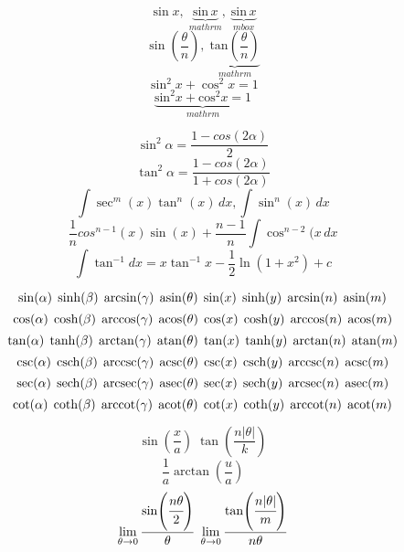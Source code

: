 \documentclass{article}
\begin{document}
\[ \sin x ,\; \underbrace{\mathrm{sin}\,x}_{mathrm},\; \underbrace{\mbox{sin}\, x}_{mbox} \]
\[ \sin\!\left(\frac{\theta}{n}\right),\; \underbrace{\mathrm{tan}\!\left(\frac{\theta}{n}\right)}_{mathrm} \]
\[ \sin^2\!x + \cos^2 \!x = 1 \]
\[ \underbrace{\mathrm{sin}^2 x + \mathrm{cos}^2 x = 1 }_{mathrm} \]

\[ \sin^2\alpha = \frac{1-cos(2\alpha)}{2} \]
\[ \tan^2\alpha = \frac{1-cos(2\alpha)}{1+cos(2\alpha)} \]
\[ \int \sec^m(x) \tan^n(x)\,dx, \int \sin^n(x)\,dx \]
\[ \frac{1}{n}cos^{n-1}(x)\sin(x) + \frac{n-1}{n}\int \cos^{n-2}(x\,dx \]
\[ \int\tan^{-1}dx=x\tan^{-1}x-\frac{1}{2}\ln\left(1+x^2\right) +c \]  

\[ \sin(\alpha)\; \sinh(\beta)\;\arcsin(\gamma)\;\asin(\theta)\;\sine(x)\;\hypsine(y)\;\arcsine(n)\;\asine(m)\]
\[ \cos(\alpha)\;\cosh(\beta)\;\arccos(\gamma)\;\acos(\theta)\;\cosine(x)\;\hypcosine(y)\;\arccosine(n)\;\acosine(m) \]
\[ \tan(\alpha)\;\tanh(\beta)\;\arctan(\gamma)\;\atan(\theta)\;\tangent(x)\;\hyptangent(y)\;\arctangent(n)\;\atangent(m) \]
\[ \csc(\alpha)\;\csch(\beta)\;\arccsc(\gamma)\;\acsc(\theta)\;\cosecant(x)\;\hypcosecant(y)\;\arccosecant(n)\;\acosecant(m) \]
\[ \sec(\alpha)\;\sech(\beta)\;\arcsec(\gamma)\;\asec(\theta)\;\secant(x)\;\hypsecant(y)\;\arcsecant(n)\;\asecant(m) \]
\[ \cot(\alpha)\;\coth(\beta)\;\arccot(\gamma)\;\acot(\theta)\;\cotangent(x)\;\hypcotangent(y)\;\arccotangent(n)\;\acotangent(m) \]

\[ \sin(\frac{x}{a})\;\tan(\frac{n|\theta|}{k})\]
\[ \frac{1}{a}\arctan(\frac{u}{a})\]
\[ \lim_{\theta \to 0}\frac{\sin(\cfrac{n\theta}{2})}{\theta}\;\lim_{\theta \to 0}\frac{\tan(\cfrac{n|\theta|}{m})}{n\theta}\]
\end{document}
